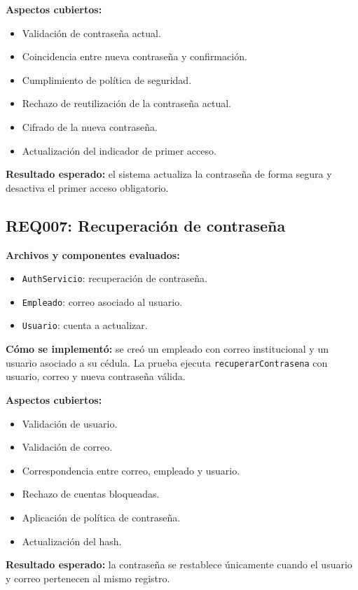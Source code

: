 \documentclass[12pt,a4paper]{article}
\begin{document}
\textbf{Aspectos cubiertos:}
\begin{itemize}[leftmargin=*]
    \item Validación de contraseña actual.
    \item Coincidencia entre nueva contraseña y confirmación.
    \item Cumplimiento de política de seguridad.
    \item Rechazo de reutilización de la contraseña actual.
    \item Cifrado de la nueva contraseña.
    \item Actualización del indicador de primer acceso.
\end{itemize}

\textbf{Resultado esperado:} el sistema actualiza la contraseña de forma segura y desactiva el primer acceso obligatorio.

\subsection{REQ007: Recuperación de contraseña}

\textbf{Archivos y componentes evaluados:}
\begin{itemize}[leftmargin=*]
    \item \texttt{AuthServicio}: recuperación de contraseña.
    \item \texttt{Empleado}: correo asociado al usuario.
    \item \texttt{Usuario}: cuenta a actualizar.
\end{itemize}

\textbf{Cómo se implementó:} se creó un empleado con correo institucional y un usuario asociado a su cédula. La prueba ejecuta \texttt{recuperarContrasena} con usuario, correo y nueva contraseña válida.

\textbf{Aspectos cubiertos:}
\begin{itemize}[leftmargin=*]
    \item Validación de usuario.
    \item Validación de correo.
    \item Correspondencia entre correo, empleado y usuario.
    \item Rechazo de cuentas bloqueadas.
    \item Aplicación de política de contraseña.
    \item Actualización del hash.
\end{itemize}

\textbf{Resultado esperado:} la contraseña se restablece únicamente cuando el usuario y correo pertenecen al mismo registro.
\end{document}
